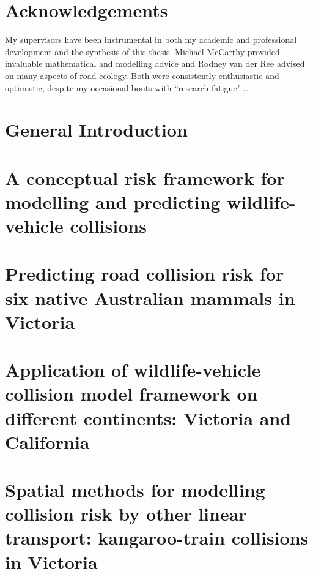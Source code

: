 \documentclass[titlesmallcaps,copyrightpage,examinerscopy]{uomthesis}
\begin{document}
\chapter{Acknowledgements}

My supervisors have been instrumental in both my academic and professional development and the synthesis of this thesis.  Michael McCarthy provided invaluable mathematical and modelling advice and Rodney van der Ree advised on many aspects of road ecology.  Both were consistently enthusiastic and optimistic, despite my occasional bouts with ``research fatigue" \ldots

\tableofcontents
\listoffigures
\listoftables

\mainmatter

%
\chapter{General Introduction}\label{sec:intro}

%
\chapter{A conceptual risk framework for modelling and predicting wildlife-vehicle collisions}\label{sec:egk}


%
\chapter{Predicting road collision risk for six native Australian mammals in Victoria}\label{sec:6sp}

%
\chapter{Application of wildlife-vehicle collision model framework on different continents: Victoria and California}\label{sec:cal}

%
\chapter{Spatial methods for modelling collision risk by other linear transport: kangaroo-train collisions in Victoria}\label{sec:train}


\end{document}
